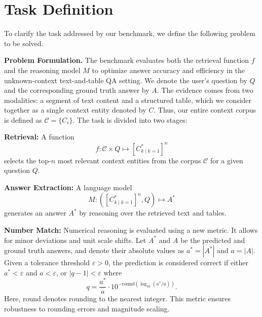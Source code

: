 \documentclass[10pt]{article}
\begin{document}
\section{Task Definition}
To clarify the task addressed by our benchmark, we define the following problem to be solved.

\textbf{Problem Formulation.} The benchmark evaluates both the retrieval function $f$ and the reasoning model $M$ to optimize answer accuracy and efficiency in the unknown-context text-and-table QA setting. We denote the user's question by $Q$ and the corresponding ground truth answer by $A$. The evidence comes from two modalities: a segment of text content and a structured table, which we consider together as a single context entity denoted by $C$. Thus, our entire context corpus is defined as $\mathcal{C} = \{C_i\}$. The task is divided into two stages:

\textbf{Retrieval:} A function
\begin{equation}
f: \mathcal{C} \times Q \mapsto \left[ C_{k \mid k = 1}^{*} \right]^{n}
\end{equation}
selects the top-$n$ most relevant context entities from the corpus $\mathcal{C}$ for a given question $Q$.

\textbf{Answer Extraction:} A language model
\begin{equation}
M: \left(\left[ C_{k \mid k = 1}^{*} \right]^{n}, Q\right) \mapsto A^{*}
\end{equation}
generates an answer $A^{*}$ by reasoning over the retrieved text and tables.

\textbf{Number Match:} Numerical reasoning is evaluated using a new metric. It allows for minor deviations and unit scale shifts. Let $A^{*}$ and $A$ be the predicted and ground truth answers, and denote their absolute values as $a^{*} = |A^{*}|$ and $a = |A|$. Given a tolerance threshold $\varepsilon > 0$, the prediction is considered correct if either $a^{*} < \varepsilon$ and $a < \varepsilon$, or $|q - 1| < \varepsilon$ where
\begin{equation}
q = \frac{a^{*}}{a} \cdot 10^{-\mathrm{round}(\log_{10}(a^{*}/a))}.
\end{equation}
Here, round denotes rounding to the nearest integer. This metric ensures robustness to rounding errors and magnitude scaling.
\end{document}
